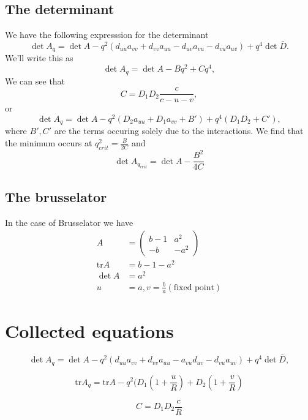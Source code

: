 \documentclass{article}
\newcommand{\tr}{\text{tr}}
\begin{document}
\subsection{The determinant}
We have the following expresssion for the determinant
\begin{equation}
\det A_q = \det A - q^2(d_{uu}a_{vv}+d_{vv}a_{uu}-d_{uv}a_{vu}-d_{vu}a_{uv})+q^4 \det \bar{D}.
\end{equation}
We'll write this as
\begin{equation}
\det A_q = \det A - Bq^2 + C q^4,
\end{equation}
We can see that
\begin{equation}
C = D_1D_2\frac{c}{c-u-v},
\end{equation}
or
\begin{equation}
\det A_q = \det A - q^2(D_{2}a_{uu}+D_1a_{vv} + B') + q^4 (D_1 D_2 + C'),
\end{equation}
where $B',C'$ are the terms occuring solely due to the interactions.
We find that the minimum occurs at $q_{crit}^2 = \frac {B}{2C}$ and
\begin{equation}
\det A_{q_{crit}} = \det A - \frac{B^2}{4C}
\end{equation}


\subsection{The brusselator}
In the case of Brusselator we have
\begin{align}
A&=\begin{pmatrix}b-1& a^2 \\ -b &-a^2\end{pmatrix}\\
\tr A &= b-1-a^2\\
\det A&= a^2\\
u&=a,v=\frac{b}{a} (\text{fixed point})
\end{align}

\section{Collected equations}
	\begin{equation}
	\det A_{q}=\det A-q^2\left(d_{uu}a_{vv}+d_{vv}a_{uu}-a_{vu}d_{uv}-d_{vu}a_{uv}\right)+q^4 \det \bar{D},
	\end{equation}
	
	\begin{equation}
	\tr A_q = \tr A - q^2 (D_1 (1+\frac uR) + D_2 (1+\frac vR)
	\end{equation}
	
	\begin{equation}
	C = D_1D_2 \frac{c}{R}
	\end{equation}
	
\end{document}
